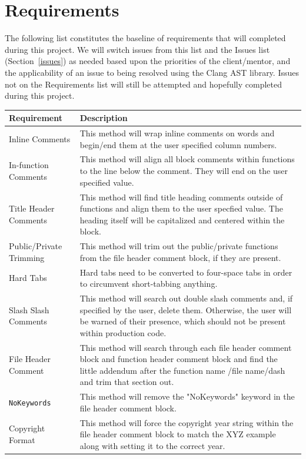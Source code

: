 \documentclass[11pt]{scrreprt}
\begin{document}
\section{Requirements}
The following list constitutes the baseline of requirements that will completed during this project. We will switch issues from this list and the Issues list (Section~\ref{issues}) as needed based upon the priorities of the client/mentor, and the applicability of an issue to being resolved using the Clang AST library. Issues not on the Requirements list will still be attempted and hopefully completed during this project.

\begin{longtable}{| p{} | p{} |} 
\hline
\textbf{Requirement} & \textbf{Description}\\ \hline
Inline Comments & This method will wrap inline comments on words and begin/end them at the user specified column numbers.\\ \hline
In-function Comments & This method will align all block comments within functions to the line below the comment. They will end on the user specified value.\\ \hline
Title Header Comments & This method will find title heading comments outside of functions and align them to the user specfied value. The heading itself will be capitalized and centered within the block.\\ \hline
Public/Private Trimming & This method will trim out the public/private functions from the file header comment block, if they are present.\\ \hline
Hard Tabs & Hard tabs need to be converted to four-space tabs in order to circumvent short-tabbing anything.\\ \hline
Slash Slash Comments & This method will search out double slash comments and, if specified by the user, delete them. Otherwise, the user will be warned of their presence, which should not be present within production code.\\ \hline
File Header Comment & This method will search through each file header comment block and function header comment block and find the little addendum after the function name /file name/dash and trim that section out.\\ \hline
\texttt{NoKeywords} & This method will remove the "NoKeywords" keyword in the file header comment block.\\ \hline
Copyright Format & This method will force the copyright year string within the file header comment block to match the XYZ example along with setting it to the correct year.\\ \hline

\end{longtable}
\end{document}
